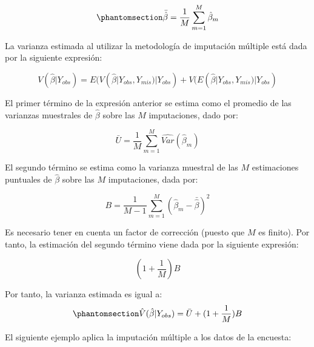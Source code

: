 \documentclass[
  spanish,
  11pt,
  letterpaper,
  oneside,
  open=any]{scrbook}
\newenvironment{Shaded}{\begin{snugshade}}{\end{snugshade}}
\newcommand{\FunctionTok}[1]{\textcolor[rgb]{0.28,0.35,0.67}{#1}}
\newcommand{\NormalTok}[1]{\textcolor[rgb]{0.00,0.23,0.31}{#1}}
\newcommand{\OtherTok}[1]{\textcolor[rgb]{0.00,0.23,0.31}{#1}}
\newcommand{\SpecialCharTok}[1]{\textcolor[rgb]{0.37,0.37,0.37}{#1}}
\begin{document}
\begin{equation}\protect\phantomsection\label{eq-estimador-imputacion-multiple}{\bar{\hat{\beta}} = \frac{1}{M} \sum_{m = 1} ^ M \hat{\beta}_m}\end{equation}

La varianza estimada al utilizar la metodología de imputación múltiple
está dada por la siguiente expresión:

\[
V(\hat{\beta} | Y_{obs}) = E(V(\hat{\beta} | Y_{obs}, Y_{mis}) | Y_{obs}) +
V(E(\hat{\beta} | Y_{obs}, Y_{mis}) | Y_{obs})
\]

El primer término de la expresión anterior se estima como el promedio de
las varianzas muestrales de \(\hat{\beta}\) sobre las \(M\)
imputaciones, dado por:

\[\bar{U} = \frac{1}{M} \sum_{m = 1} ^ M \widehat{Var}(\hat{\beta}_m)\]

El segundo término se estima como la varianza muestral de las \(M\)
estimaciones puntuales de \(\hat{\beta}\) sobre las \(M\) imputaciones,
dada por:

\[B = \frac{1}{M-1} \sum_{m = 1} ^ M (\hat{\beta}_m - \bar{\hat{\beta}})^2\]

Es necesario tener en cuenta un factor de corrección (puesto que \(M\)
es finito). Por tanto, la estimación del segundo término viene dada por
la siguiente expresión:

\[
(1 + \frac{1}{M}) B
\]

Por tanto, la varianza estimada es igual a:
\begin{equation}\protect\phantomsection\label{eq-varianza-imputacion-multiple}{\hat{V}(\hat{\beta} | Y_{obs}) = \bar{U} + (1 + \frac{1}{M}) B}\end{equation}

El siguiente ejemplo aplica la imputación múltiple a los datos de la
encuesta:

\begin{Shaded}
\end{Shaded}
\end{document}
